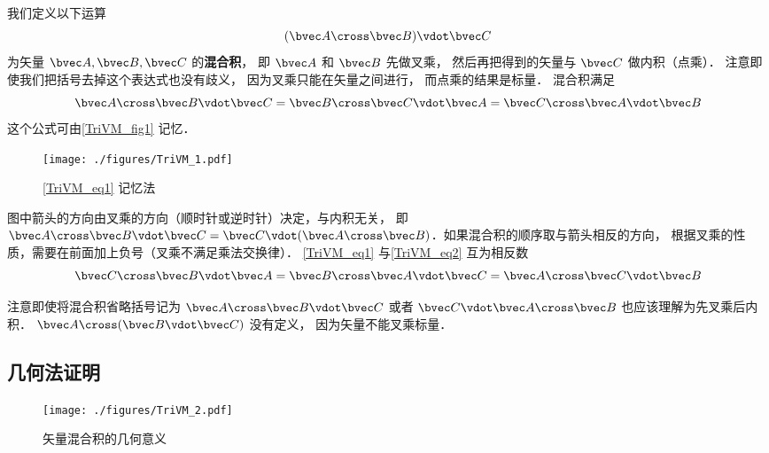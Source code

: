 
我们定义以下运算
\begin{equation}
(\bvec A \cross \bvec B) \vdot \bvec C
\end{equation}
为矢量 $\bvec A, \bvec B, \bvec C$ 的\textbf{混合积}， 即 $\bvec A$ 和 $\bvec B$ 先做叉乘， 然后再把得到的矢量与 $\bvec C$ 做内积（点乘）． 注意即使我们把括号去掉这个表达式也没有歧义， 因为叉乘只能在矢量之间进行， 而点乘的结果是标量． 混合积满足
\begin{equation}\label{TriVM_eq1}
\bvec A \cross \bvec B \vdot \bvec C = \bvec B \cross \bvec C \vdot \bvec A = \bvec C \cross \bvec A \vdot \bvec B
\end{equation} 
这个公式可由\autoref{TriVM_fig1} 记忆．
\begin{figure}[ht]
\centering %
\texttt{[image: ./figures/TriVM\_1.pdf]}
\caption{\autoref{TriVM_eq1} 记忆法}\label{TriVM_fig1}
\end{figure}
图中箭头的方向由叉乘的方向（顺时针或逆时针）决定，与内积无关， 即 $\bvec A\cross \bvec B \vdot \bvec C = \bvec C \vdot (\bvec A \cross \bvec B)$．如果混合积的顺序取与箭头相反的方向， 根据叉乘的性质，需要在前面加上负号（叉乘不满足乘法交换律）． \autoref{TriVM_eq1} 与\autoref{TriVM_eq2} 互为相反数
\begin{equation}\label{TriVM_eq2}
\bvec C \cross \bvec B \vdot \bvec A = \bvec B \cross \bvec A \vdot \bvec C = \bvec A \cross \bvec C \vdot \bvec B
\end{equation}

注意即使将混合积省略括号记为 $\bvec A \cross \bvec B \vdot \bvec C$ 或者 $\bvec C \vdot \bvec A \cross \bvec B$ 也应该理解为先叉乘后内积． $\bvec A \cross (\bvec B \vdot \bvec C)$ 没有定义， 因为矢量不能叉乘标量．

\subsection{几何法证明}

\begin{figure}[ht]
\centering
\texttt{[image: ./figures/TriVM\_2.pdf]}
\caption{矢量混合积的几何意义} \label{TriVM_fig2}
\end{figure}

